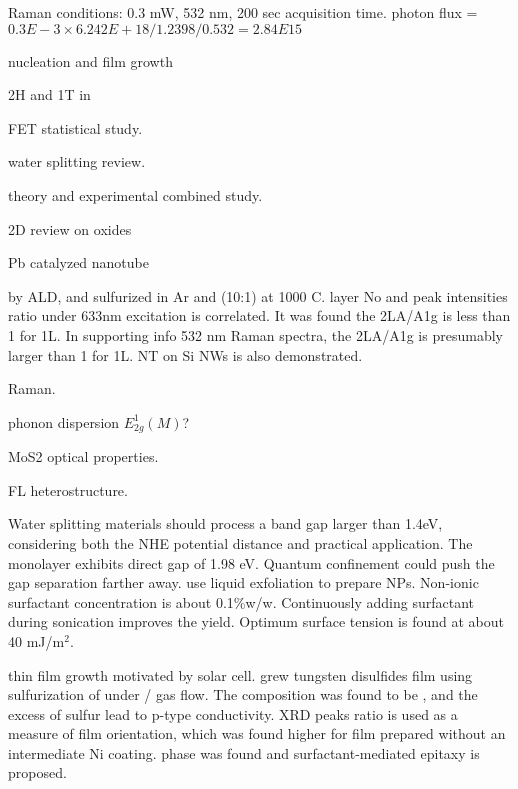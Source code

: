 Raman conditions: 0.3 mW, 532 nm, 200 sec acquisition time. photon flux = $0.3E-3\times6.242E+18/1.2398/0.532=2.84E15$

nucleation and film growth \cite{Hanbucken1984}

2H and 1T in  \cite{Eda2012}

 FET statistical study. \cite{Liu2013i}

water splitting review. \cite{B800489G}

 theory and experimental combined study. \cite{Klein2001}

2D review on oxides \cite{Osada2012}

Pb catalyzed  nanotube \cite{Brontvein2012}

\cite{Song2013}  by ALD, and sulfurized in Ar and  (10:1) at 1000 C.  layer No and peak intensities ratio under 633nm excitation is correlated. It was found the 2LA/A1g is less than 1 for 1L. In supporting info 532 nm Raman spectra, the 2LA/A1g is presumably larger than 1 for 1L.  NT on Si NWs is also demonstrated.

 Raman.\cite{Zhao2013} \cite{Sekine1980}

phonon dispersion $E_{2g}^1(M)$? \cite{Ataca2012}

MoS2 optical properties.\cite{Search1979}

FL heterostructure. \cite{Yu2013a}

Water splitting materials should process a band gap larger than 1.4eV, considering both the NHE potential distance and practical application. The monolayer  exhibits direct gap of 1.98 eV. Quantum confinement could push the gap separation farther away. \cite{wilcoxon1997} \citeauthor{Notley2013} use liquid exfoliation to prepare  NPs.\cite{Notley2013} Non-ionic surfactant concentration is about 0.1\%w/w. Continuously adding surfactant during sonication improves the yield. Optimum surface tension is found at about 40 mJ/m$^2$.

 thin film growth motivated by solar cell. \cite{Ennaoui1995a} grew tungsten disulfides film using sulfurization of  under / gas flow. The composition was found to be , and the excess of sulfur lead to p-type conductivity. XRD peaks ratio is used as a measure of film orientation, which was found higher for film prepared without an intermediate Ni coating.  phase was found and surfactant-mediated epitaxy is proposed.

